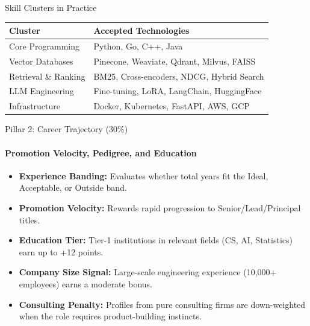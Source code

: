 \documentclass[aspectratio=169]{beamer}
\begin{document}
\begin{frame}{Skill Clusters in Practice}
  \begin{table}
    \centering
    \begin{tabular}{@{}ll@{}}
      \toprule
      \textbf{Cluster} & \textbf{Accepted Technologies} \\
      \midrule
      Core Programming  & Python, Go, C++, Java \\
      Vector Databases  & Pinecone, Weaviate, Qdrant, Milvus, FAISS \\
      Retrieval \& Ranking & BM25, Cross-encoders, NDCG, Hybrid Search \\
      LLM Engineering   & Fine-tuning, LoRA, LangChain, HuggingFace \\
      Infrastructure    & Docker, Kubernetes, FastAPI, AWS, GCP \\
      \bottomrule
    \end{tabular}
  \end{table}
\end{frame}

\begin{frame}{Pillar 2: Career Trajectory (30\%)}
  \framesubtitle{Promotion Velocity, Pedigree, and Education}
  \begin{itemize}
    \item \textbf{Experience Banding:} Evaluates whether total years fit the Ideal, Acceptable, or Outside band.
    \item \textbf{Promotion Velocity:} Rewards rapid progression to Senior/Lead/Principal titles.
    \item \textbf{Education Tier:} Tier-1 institutions in relevant fields (CS, AI, Statistics) earn up to +12 points.
    \item \textbf{Company Size Signal:} Large-scale engineering experience (10,000+ employees) earns a moderate bonus.
    \item \textbf{Consulting Penalty:} Profiles from pure consulting firms are down-weighted when the role requires product-building instincts.
  \end{itemize}
\end{frame}
\end{document}
